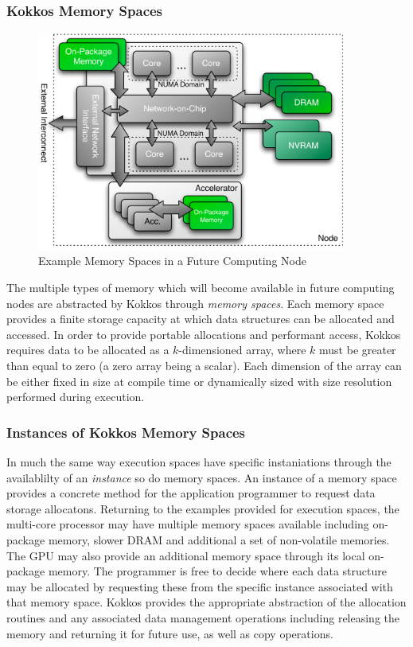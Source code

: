 \subsubsection{Kokkos Memory Spaces}

\begin{figure}
\begin{center}
\includegraphics[width=4in]{figures/kokkos-memory-space.pdf}
\caption{Example Memory Spaces in a Future Computing Node}
\label{fig:kokkos_memory_spaces}
\end{center}
\end{figure}

The multiple types of memory which will become available in future
computing nodes are abstracted by Kokkos through {\em memory
spaces}. Each memory space provides a finite storage capacity
at which data structures can be allocated and accessed. In
order to provide portable allocations and performant access,
Kokkos requires data to be allocated as a $k$-dimensioned array,
where $k$ must be greater than equal to zero (a zero array being
a scalar). Each dimension of the array can be either fixed in
size at compile time or dynamically sized with size resolution
performed during execution.

\subsubsection{Instances of Kokkos Memory Spaces}

In much the same way execution spaces have specific instaniations through
the availablilty of an {\em instance} so do memory spaces. An instance
of a memory space provides a concrete method for the
application programmer to request data storage allocatons. Returning
to the examples provided for execution spaces, the multi-core
processor may have multiple memory spaces available including
on-package memory, slower DRAM and additional a set of non-volatile
memories. The GPU may also provide an additional memory space
through its local on-package memory. The programmer is free
to decide where each data structure may be allocated by requesting
these from the specific instance associated with that memory space.
Kokkos provides the appropriate abstraction of the allocation
routines and any associated data management operations including
releasing the memory and returning it for future use, as well as
copy operations.

